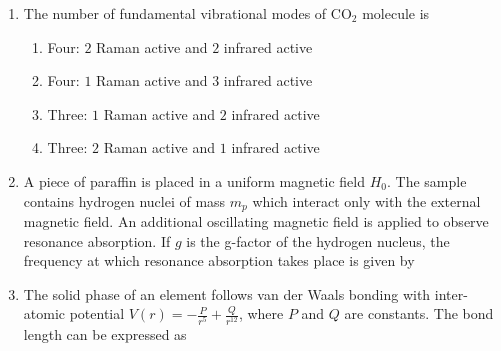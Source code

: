 \documentclass[journal,13pt,onecolumn]{IEEEtran}
\begin{document}
\begin{enumerate}[itemsep = 1em]
\hfill{}
\begin{enumerate}
\end{enumerate}

\item The number of fundamental vibrational modes of CO$_{2}$ molecule is

\hfill{}
\begin{enumerate}

\item Four: $2$ Raman active and $2$ infrared active
\item Four: $1$ Raman active and $3$ infrared active
\item Three: $1$ Raman active and $2$ infrared active
\item Three: $2$ Raman active and $1$ infrared active

\end{enumerate}


\item A piece of paraffin is placed in a uniform magnetic field $H_{0}$. The sample contains hydrogen nuclei of mass $m_{p}$ which interact only with the external magnetic field. An additional oscillating magnetic field is applied to observe resonance absorption. If $g$ is the g-factor of the hydrogen nucleus, the frequency at which resonance absorption takes place is given by

\hfill{}
\begin{enumerate}
\end{enumerate}

\item The solid phase of an element follows van der Waals bonding with inter-atomic potential $V(r) = - \frac{P}{r^5} + \frac{Q}{r^{12}}$, where $P$ and $Q$ are constants. The bond length can be expressed as


\end{enumerate}
\end{document}
